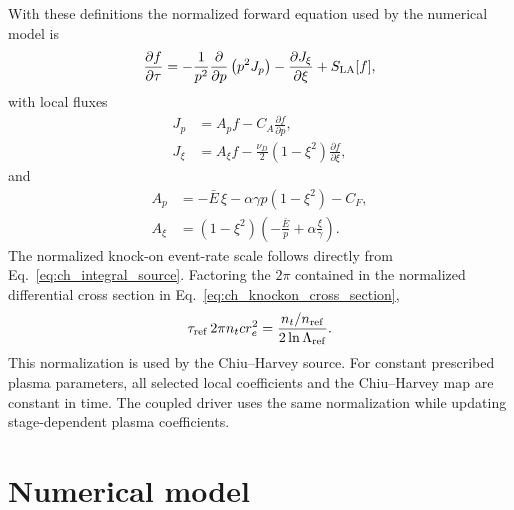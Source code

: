 \documentclass[11pt]{article}
\begin{document}
With these definitions the normalized forward equation used by the numerical model is
\begin{equation}
 \frac{\partial f}{\partial\tau}
 =-\frac{1}{p^2}\frac{\partial}{\partial p}\left(p^2J_p\right)
  -\frac{\partial J_\xi}{\partial\xi}
  +S_{\rm LA}[f],
 \label{eq:normalized_forward}
\end{equation}
with local fluxes
\begin{align}
 J_p
 &=A_p f-C_A\frac{\partial f}{\partial p},
 \label{eq:normalized_Jp}\\
 J_\xi
 &=A_\xi f
   -\frac{\nu_D}{2}(1-\xi^2)\frac{\partial f}{\partial\xi},
 \label{eq:normalized_Jxi}
\end{align}
and
\begin{align}
 A_p
 &=-\bar E\,\xi
   -\alpha\gamma p(1-\xi^2)
   -C_F,
 \label{eq:normalized_Ap}\\
 A_\xi
 &=(1-\xi^2)
   \left(-\frac{\bar E}{p}+\alpha\frac{\xi}{\gamma}\right).
 \label{eq:normalized_Axi}
\end{align}
The normalized knock-on event-rate scale follows directly from
Eq.~\eqref{eq:ch_integral_source}.  Factoring the $2\pi$ contained in the normalized
differential cross section in Eq.~\eqref{eq:ch_knockon_cross_section},
\begin{equation}
 \tau_{\rm ref}\,2\pi n_t c r_e^2
 =\frac{n_t/n_{\rm ref}}{2\ln\Lambda_{\rm ref}}.
 \label{eq:normalized_knockon_scale}
\end{equation}
This normalization is used by the Chiu--Harvey source.  For constant prescribed plasma
parameters, all selected local coefficients and the Chiu--Harvey map are constant in
time.  The coupled driver uses the same normalization while updating stage-dependent
plasma coefficients.

\section{Numerical model}
\end{document}
